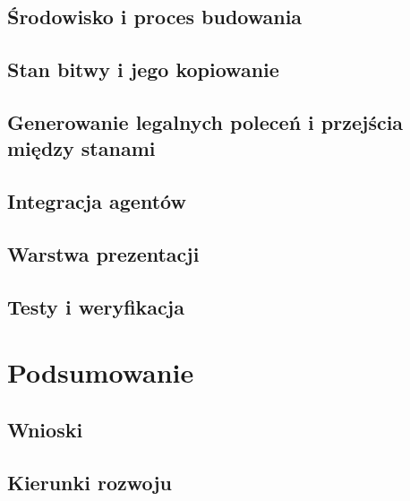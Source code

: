 \documentclass[
    bindingoffset=5mm,
    footnoteindent=3mm,
    hyphenation=true
]{src/wut-thesis}
\begin{document}
\subsection{Środowisko i proces budowania}

\subsection{Stan bitwy i jego kopiowanie}

\subsection{Generowanie legalnych poleceń i przejścia między stanami}

\subsection{Integracja agentów}

\subsection{Warstwa prezentacji}

\subsection{Testy i weryfikacja}

\clearpage
\section{Podsumowanie}

\subsection{Wnioski}

\subsection{Kierunki rozwoju}

\clearpage
\printbibliography

\clearpage
\listoffigurestoc

\clearpage
\listoftablestoc

\clearpage
\listofappendicestoc

\clearpage
{}
\end{document}
